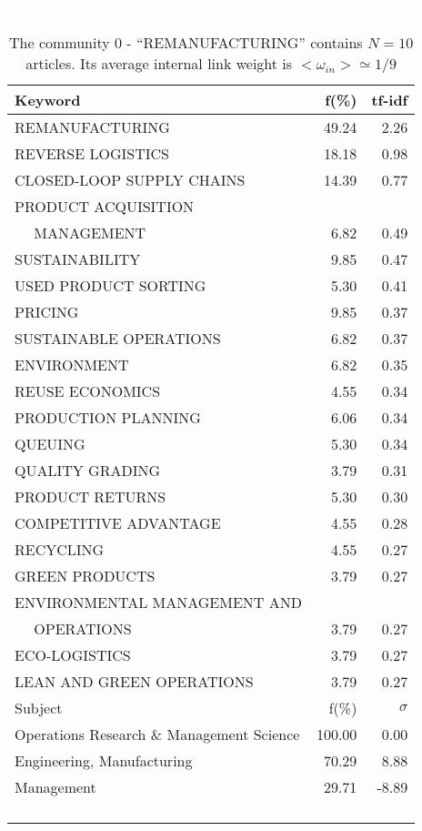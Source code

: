 \documentclass[a4paper,11pt]{report}
\begin{document}
\begin{landscape}
\clearpage

\begin{table}[!ht]
\caption{The community 0 - ``REMANUFACTURING'' contains $N = 10$ articles. Its average internal link weight is $<\omega_{in}> \simeq 1/9$ }
\textcolor{white}{aa}\\
{\scriptsize\begin{tabular}{|l r  r|}
\hline
Keyword & f(\%) & tf-idf \\
\hline
REMANUFACTURING & 49.24 & 2.26\\
REVERSE LOGISTICS & 18.18 & 0.98\\
CLOSED-LOOP SUPPLY CHAINS & 14.39 & 0.77\\
PRODUCT ACQUISITION &  &\\
$\quad$ MANAGEMENT & 6.82 & 0.49\\
SUSTAINABILITY & 9.85 & 0.47\\
USED PRODUCT SORTING & 5.30 & 0.41\\
PRICING & 9.85 & 0.37\\
SUSTAINABLE OPERATIONS & 6.82 & 0.37\\
ENVIRONMENT & 6.82 & 0.35\\
REUSE ECONOMICS & 4.55 & 0.34\\
PRODUCTION PLANNING & 6.06 & 0.34\\
QUEUING & 5.30 & 0.34\\
QUALITY GRADING & 3.79 & 0.31\\
PRODUCT RETURNS & 5.30 & 0.30\\
COMPETITIVE ADVANTAGE & 4.55 & 0.28\\
RECYCLING & 4.55 & 0.27\\
GREEN PRODUCTS & 3.79 & 0.27\\
ENVIRONMENTAL MANAGEMENT AND &  &\\
$\quad$ OPERATIONS & 3.79 & 0.27\\
ECO-LOGISTICS & 3.79 & 0.27\\
LEAN AND GREEN OPERATIONS & 3.79 & 0.27\\
\hline
\hline
Subject & f(\%) & $\sigma$\\
\hline
Operations Research \& Management Science & 100.00 & 0.00\\
Engineering, Manufacturing & 70.29 & 8.88\\
Management & 29.71 & -8.89\\
 &  & \\
 &  & \\
 &  & \\
 &  & \\

\end{tabular}}
\end{table}
\end{landscape}
\end{document}
